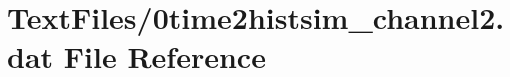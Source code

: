 \hypertarget{0time2histsim__channel2_8dat}{}\section{Text\+Files/0time2histsim\+\_\+channel2.dat File Reference}
\label{0time2histsim__channel2_8dat}
